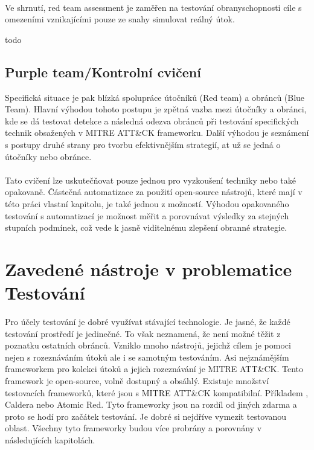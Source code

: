 \paragraph{}
Ve shrnutí, red team assessment je zaměřen na testování obranyschopnosti cíle s omezeními vznikajícími pouze ze snahy simulovat reálný útok.

todo\cite{red_team_oakley_2019}

\subsection{Purple team/Kontrolní cvičení}
Specifická situace je pak blízká spolupráce útočníků (Red team) a obránců (Blue Team).
Hlavní výhodou tohoto postupu je zpětná vazba mezi útočníky a obránci, kde se dá testovat detekce a následná odezva obránců při testování specifických technik obsažených v MITRE ATT\&CK frameworku.
Další výhodou je seznámení s postupy druhé strany pro tvorbu efektivnějším strategií, at už se jedná o útočníky nebo obránce.
\paragraph{}
Tato cvičení lze uskutečňovat pouze jednou pro vyzkoušení techniky nebo také opakovaně.
Částečná automatizace za použití open-source nástrojů, které mají v této práci vlastní kapitolu, je také jednou z možností.
Výhodou opakovaného testování s automatizací je možnost měřit a porovnávat výsledky za stejných stupních podmínek, což vede k jasně viditelnému zlepšení obranné strategie.\cite{securityInteligence_pen_test_red_team_purple_team,redscan_team_purple_team}

\section{Zavedené nástroje v problematice Testování}
Pro účely testování je dobré využívat stávající technologie.
Je jasné, že každé testování prostředí je jedinečné.
To však neznamená, že není možné těžit z poznatku ostatních obránců.
Vzniklo mnoho nástrojů, jejichž cílem je pomoci nejen s rozeznáváním útoků ale i se samotným testováním.
Asi nejznámějším frameworkem pro kolekci útoků a jejich rozeznávání je MITRE ATT\&CK\cite{mitre_attack_framework}.
Tento framework je open-source, volně dostupný a obsáhlý.
Existuje množství testovacích frameworků, které jsou s MITRE ATT\&CK kompatibilní\cite{csoonline_4_testing_frameworks}.
Příkladem , Caldera nebo Atomic Red.
Tyto frameworky jsou na rozdíl od jiných zdarma a proto se hodí pro začátek testování.
Je dobré si nejdříve vymezit testovanou oblast.
Všechny tyto frameworky budou více probrány a porovnány v následujících kapitolách.


